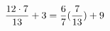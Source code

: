 \documentclass[preview]{standalone}
\begin{document}
\begin{align*}
\special{dvisvgm:raw <g id='unique000'>}\frac{12 \cdot 7}{13} + 3 = \frac{6}{7} (\frac{7}{13}) + 9\special{dvisvgm:raw </g>}
\end{align*}
\end{document}
